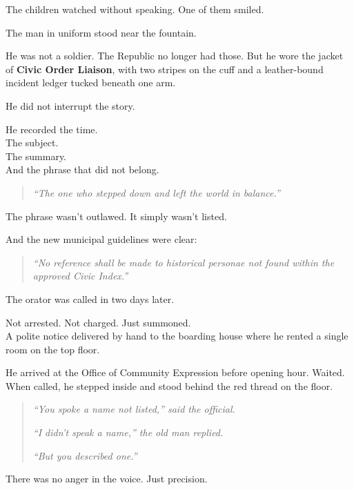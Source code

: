 \documentclass[12pt]{article}
\begin{document}
The children watched without speaking. One of them smiled.

\vspace{1em}

The man in uniform stood near the fountain.

He was not a soldier. The Republic no longer had those. But he wore the jacket of \textbf{Civic Order Liaison}, with two stripes on the cuff and a leather-bound incident ledger tucked beneath one arm.

He did not interrupt the story.

He recorded the time.\\
The subject.\\
The summary.\\
And the phrase that did not belong.

\begin{quote}
\textit{“The one who stepped down and left the world in balance.”}
\end{quote}

The phrase wasn’t outlawed. It simply wasn’t listed.

And the new municipal guidelines were clear:

\begin{quote}
\textit{“No reference shall be made to historical personae not found within the approved Civic Index.”}
\end{quote}

\vspace{1em}

The orator was called in two days later.

Not arrested. Not charged. Just summoned.\\
A polite notice delivered by hand to the boarding house where he rented a single room on the top floor.

He arrived at the Office of Community Expression before opening hour. Waited. When called, he stepped inside and stood behind the red thread on the floor.

\begin{quote}
\textit{“You spoke a name not listed,” said the official.}

\textit{“I didn’t speak a name,” the old man replied.}

\textit{“But you described one.”}
\end{quote}

There was no anger in the voice. Just precision.

\vspace{1em}
\end{document}
